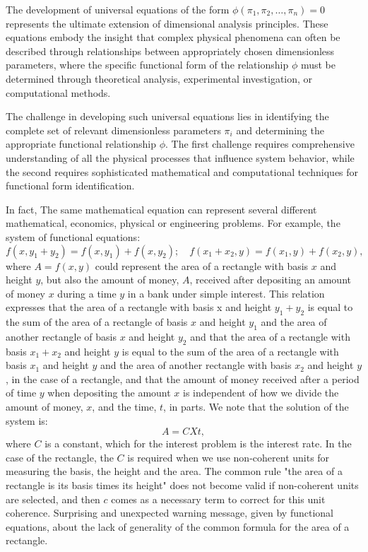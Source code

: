 \documentclass[
	11pt, %
	fleqn, %
	a4paper, %
]{LegrandOrangeBook}
\begin{document}
The development of universal equations of the form $\phi(\pi_1, \pi_2, \dots, \pi_n) = 0$ represents the ultimate extension of dimensional analysis principles. These equations embody the insight that complex physical phenomena can often be described through relationships between appropriately chosen dimensionless parameters, where the specific functional form of the relationship $\phi$ must be determined through theoretical analysis, experimental investigation, or computational methods.

The challenge in developing such universal equations lies in identifying the complete set of relevant dimensionless parameters $\pi_i$ and determining the appropriate functional relationship $\phi$. The first challenge requires comprehensive understanding of all the physical processes that influence system behavior, while the second requires sophisticated mathematical and computational techniques for functional form identification.

In fact, The same mathematical equation can represent several different mathematical, economics, physical or engineering problems. For example, the system of functional equations:
$$
f(x,y_1+y_2) = f(x, y_1) + f(x, y_2); \quad f(x_1 + x_2, y) = f(x_1, y) + f(x_2, y),
$$
where $A=f(x, y)$ could represent the area of a rectangle with basis $x$ and height $y$, but also the amount of money, $A$, received after depositing an amount of money $x$ during a time $y$ in a bank under simple interest. This relation expresses that the area of a rectangle with basis x and height $y_1+y_2$ is equal to the sum of the area of a rectangle of basis $x$ and height $y_1$ and the area of another rectangle of basis $x$ and height $y_2$ and that the area of a rectangle with basis $x_1 + x_2$ and height $y$ is equal to the sum of the area of a rectangle with basis $x_1$ and height $y$ and the area of another rectangle with basis $x_2$ and height $y$, in the case of a rectangle, and that the amount of money received after a period of time $y$ when depositing the amount $x$ is independent of how we divide the amount of money, $x$, and the time, $t$, in parts. We note that the solution of the system is:
$$
A = C X t,
$$
where $C$ is a constant, which for the interest problem is the interest rate. In the case of the rectangle, the $C$ is required when we use non-coherent units for measuring the basis, the height and the area. The common rule "the area of a rectangle is its basis times its height" does not become valid if non-coherent units are selected, and then $c$ comes as a necessary term to correct for this unit coherence. Surprising and unexpected warning message, given by functional equations, about the lack of generality of the common formula for the area of a rectangle.
\end{document}
